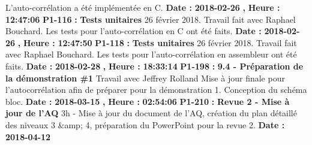 \documentclass{article}%
\begin{document}
L'auto{-}corrélation a été implémentée en C.\newline%
\newline%
%
\textbf{Date : }%
\textbf{2018{-}02{-}26}%
\textbf{,}%
\textbf{ Heure : }%
\textbf{12:47:06}%
\newline%
%
\textbf{P1{-}116 }%
\textbf{ : }%
\textbf{ Tests unitaires}%
\newline%
\newline%
%
26 février 2018.\newline%
Travail fait avec Raphael Bouchard.\newline%
Les tests pour l'auto{-}corrélation en C ont été faits.\newline%
\newline%
%
\textbf{Date : }%
\textbf{2018{-}02{-}26}%
\textbf{,}%
\textbf{ Heure : }%
\textbf{12:47:50}%
\newline%
%
\textbf{P1{-}118 }%
\textbf{ : }%
\textbf{ Tests unitaires}%
\newline%
\newline%
%
26 février 2018.\newline%
Travail fait avec Raphael Bouchard.\newline%
Les tests pour l'auto{-}corrélation en assembleur ont été faits.\newline%
\newline%
%
\textbf{Date : }%
\textbf{2018{-}02{-}28}%
\textbf{,}%
\textbf{ Heure : }%
\textbf{18:33:14}%
\newline%
%
\textbf{P1{-}198 }%
\textbf{ : }%
\textbf{ 9.4 {-} Préparation de la démonstration \#1}%
\newline%
\newline%
%
Travail avec Jeffrey Rolland\newline%
Mise à jour finale pour l'autocorrélation afin de préparer pour la démonstration 1. Conception du schéma bloc.\newline%
\newline%
%
\textbf{Date : }%
\textbf{2018{-}03{-}15}%
\textbf{,}%
\textbf{ Heure : }%
\textbf{02:54:06}%
\newline%
%
\textbf{P1{-}210 }%
\textbf{ : }%
\textbf{ Revue 2 {-} Mise à jour de l'AQ}%
\newline%
\newline%
%
3h {-} Mise à jour du document de l'AQ, création du plan détaillé des niveaux 3 \&amp; 4, préparation du PowerPoint pour la revue 2.\newline%
\newline%
%
\textbf{Date : }%
\textbf{2018{-}04{-}12}%
\end{document}
